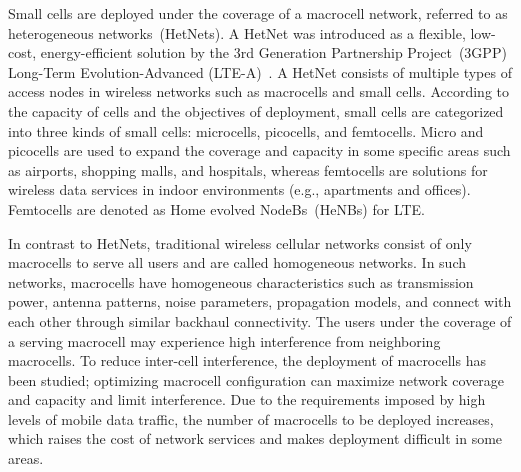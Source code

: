 \documentclass[paper]{ieice}
\begin{document}
Small cells are deployed under the coverage of a macrocell network, referred to as heterogeneous networks~(HetNets). A HetNet was introduced as a flexible, low-cost, energy-efficient solution by the 3rd Generation Partnership Project~(3GPP) Long-Term Evolution-Advanced (LTE-A)~\cite{D2011survey,Khandekar2012,TranSS2012}. A HetNet consists of multiple types of access nodes in wireless networks such as macrocells and small cells. According to the capacity of cells and the objectives of deployment, small cells are categorized into three kinds of small cells: microcells, picocells, and femtocells. Micro and picocells are used to expand the coverage and capacity in some specific areas such as airports, shopping malls, and hospitals, whereas femtocells are solutions for wireless data services in indoor environments (e.g., apartments and offices). Femtocells are denoted as Home evolved NodeBs~(HeNBs) for LTE.

In contrast to HetNets, traditional wireless cellular networks consist of only macrocells to serve all users and are called homogeneous networks. In such networks, macrocells have homogeneous characteristics such as transmission power, antenna patterns, noise parameters, propagation models, and connect with each other through similar backhaul connectivity. The users under the coverage of a serving macrocell may experience high interference from neighboring macrocells. To reduce inter-cell interference, the deployment of macrocells has been studied; optimizing macrocell configuration can maximize network coverage and capacity and limit interference. Due to the requirements imposed by high levels of mobile data traffic, the number of macrocells to be deployed increases, which raises the cost of network services and makes deployment difficult in some areas.
\end{document}

